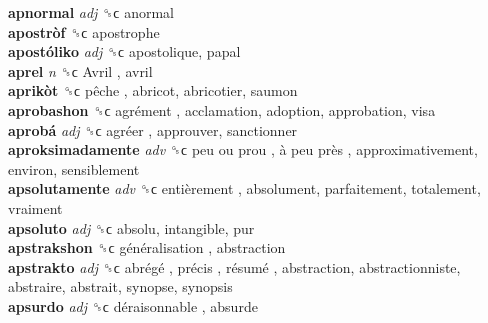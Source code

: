 \textbf{apnormal} \emph{adj}  ␝ϲ  anormal  \\
\textbf{apostròf} ␝ϲ  apostrophe  \\
\textbf{apostóliko} \emph{adj}  ␝ϲ  apostolique, papal  \\
\textbf{aprel} \emph{n}  ␝ϲ   Avril , avril  \\
\textbf{aprikòt} ␝ϲ   pêche , abricot, abricotier, saumon  \\
\textbf{aprobashon} ␝ϲ   agrément , acclamation, adoption, approbation, visa  \\
\textbf{aprobá} \emph{adj}  ␝ϲ   agréer , approuver, sanctionner  \\
\textbf{aproksimadamente} \emph{adv}  ␝ϲ   peu ou prou ,  à peu près , approximativement, environ, sensiblement  \\
\textbf{apsolutamente} \emph{adv}  ␝ϲ   entièrement , absolument, parfaitement, totalement, vraiment  \\
\textbf{apsoluto} \emph{adj}  ␝ϲ  absolu, intangible, pur  \\
\textbf{apstrakshon} ␝ϲ   généralisation , abstraction  \\
\textbf{apstrakto} \emph{adj}  ␝ϲ   abrégé ,  précis ,  résumé , abstraction, abstractionniste, abstraire, abstrait, synopse, synopsis  \\
\textbf{apsurdo} \emph{adj}  ␝ϲ   déraisonnable , absurde  \\
